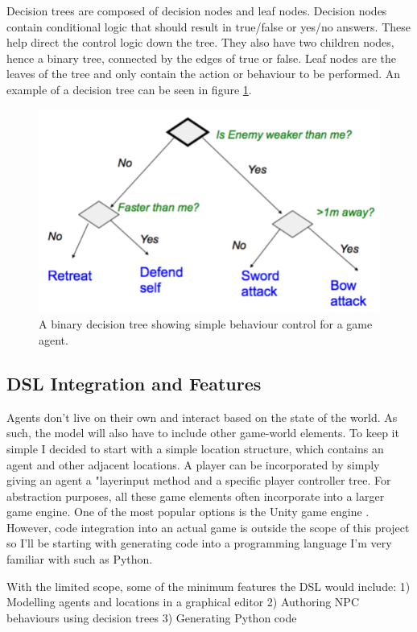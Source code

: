 \documentclass[letterpaper,12pt]{article}  %
\begin{document}
Decision trees are composed of decision nodes and leaf nodes. Decision nodes contain conditional logic that should result in true/false or yes/no answers. These help direct the control logic down the tree. They also have two children nodes, hence a binary tree, connected by the edges of true or false. Leaf nodes are the leaves of the tree and only contain the action or behaviour to be performed. An example of a decision tree can be seen in figure \ref{fig:decisiontree}.

\begin{figure}[h]  %
    \centering  %
    \includegraphics[width = 8 cm ]{DecisionTree.png}
    \caption{A binary decision tree showing simple behaviour control for a game agent.}
    \label{fig:decisiontree}
\end{figure}

\subsection{DSL Integration and Features}
Agents don’t live on their own and interact based on the state of the world. As such, the model will also have to include other game-world elements. To keep it simple I decided to start with a simple location structure, which contains an agent and other adjacent locations. A player can be incorporated by simply giving an agent a "layerinput method and a specific player controller tree. For abstraction purposes, all these game elements often incorporate into a larger game engine. One of the most popular options is the Unity game engine \cite{technologies_unity_nodate}. However, code integration into an actual game is outside the scope of this project so I’ll be starting with generating code into a programming language I’m very familiar with such as Python.

With the limited scope, some of the minimum features the DSL would include:
1)	 Modelling agents and locations in a graphical editor
2)	Authoring NPC behaviours using decision trees
3)	Generating Python code
\end{document}
